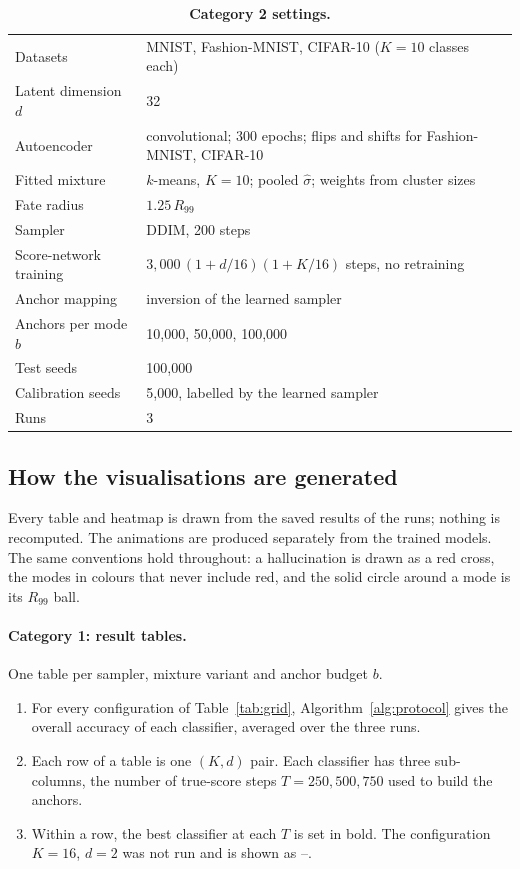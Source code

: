 \documentclass[11pt]{article}
\begin{document}
\begin{table}[!htbp]
\centering
\small
\caption{\textbf{Category 2 settings.}}
\label{tab:grid2}
\begin{tabular}{ll}
\toprule
Datasets                        & MNIST, Fashion-MNIST, CIFAR-10 ($K = 10$ classes each) \\
Latent dimension $d$            & 32 \\
Autoencoder                     & convolutional; 300 epochs; flips and shifts for Fashion-MNIST, CIFAR-10 \\
Fitted mixture                  & $k$-means, $K = 10$; pooled $\hat\sigma$; weights from cluster sizes \\
Fate radius                     & $1.25\,R_{99}$ \\
Sampler                         & DDIM, 200 steps \\
Score-network training          & $3{,}000\,(1 + d/16)(1 + K/16)$ steps, no retraining \\
Anchor mapping                  & inversion of the learned sampler \\
Anchors per mode $b$            & 10{,}000, 50{,}000, 100{,}000 \\
Test seeds                      & 100{,}000 \\
Calibration seeds               & 5{,}000, labelled by the learned sampler \\
Runs                            & 3 \\
\bottomrule
\end{tabular}
\end{table}

\FloatBarrier
\subsection{How the visualisations are generated}

Every table and heatmap is drawn from the saved results of the runs; nothing is recomputed. The
animations are produced separately from the trained models. The same conventions hold
throughout: a hallucination is drawn as a red cross, the modes in colours that never include red,
and the solid circle around a mode is its $R_{99}$ ball.

\paragraph{Category 1: result tables.}
One table per sampler, mixture variant and anchor budget $b$.
\begin{enumerate}
    \item For every configuration of Table~\ref{tab:grid}, Algorithm~\ref{alg:protocol} gives the
    overall accuracy of each classifier, averaged over the three runs.
    \item Each row of a table is one $(K, d)$ pair. Each classifier has three sub-columns, the
    number of true-score steps $T = 250, 500, 750$ used to build the anchors.
    \item Within a row, the best classifier at each $T$ is set in bold. The configuration $K = 16$,
    $d = 2$ was not run and is shown as --.
\end{enumerate}
\end{document}
